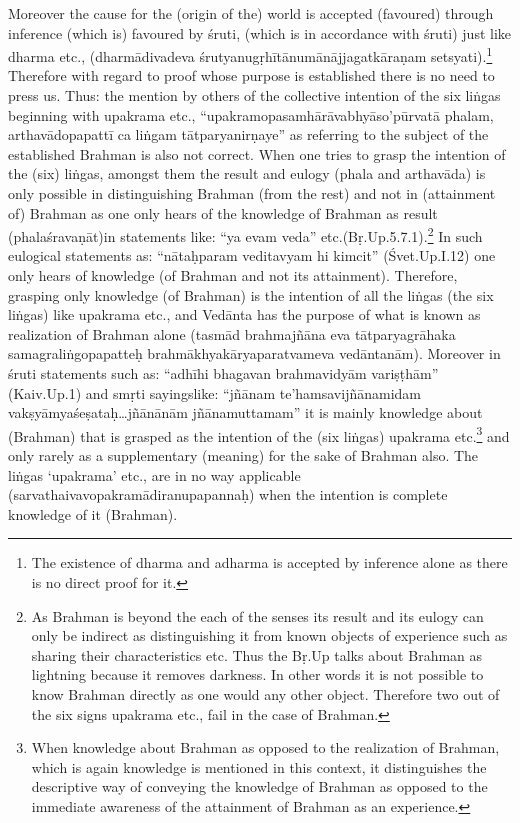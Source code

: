 

Moreover the cause for the (origin of the) world is accepted (favoured) through inference (which is) favoured by śruti, (which is in accordance with śruti) just like dharma etc., (dharmādivadeva śrutyanugṛhītānu\-mānājjagatkāraṇam setsyati).\footnote{The existence of dharma and adharma is accepted by inference alone as there is no direct proof for it.} Therefore with regard to proof whose purpose is established there is no need to press us. Thus: the mention by others of the collective intention of the six liṅgas beginning with upakrama etc., “upakramopasamhārāvabhyāso’pūrvatā phalam, arthavādopapattī ca liṅgam tātparyanirṇaye” as referring to the subject of the established Brahman is also not correct. When one tries to grasp the intention of the (six) liṅgas, amongst them the result and eulogy (phala and arthavāda) is only possible in distinguishing Brahman (from the rest) and not in (attainment of) Brahman as one only hears of the knowledge of Brahman as result (phalaśravaṇāt)in statements like: “ya evam veda” etc.(Bṛ.Up.5.7.1).\footnote{As Brahman is beyond the each of the senses its result and its eulogy can only be indirect as distinguishing it from known objects of experience such as sharing their characteristics etc. Thus the Bṛ.Up talks about Brahman as lightning because it removes darkness. In other words it is not possible to know Brahman directly as one would any other object. Therefore two out of the six signs upakrama etc., fail in the case of Brahman.} In such eulogical statements as: “nātaḥparam veditavyam hi kimcit” (Śvet.Up.I.12) one only hears of knowledge (of Brahman and not its attainment). Therefore, grasping only knowledge (of Brahman) is the intention of all the liṅgas (the six liṅgas) like upakrama etc., and Vedānta has the purpose of what is known as realization of Brahman alone (tasmād brahmajñāna eva tātparyagrāhaka samagraliṅgopapatteḥ brahmākhyakāryaparatvameva vedāntanām). Moreover in śruti statements such as: “adhīhi bhagavan brahmavidyām variṣṭhām” (Kaiv.Up.1) and smṛti sayings\break like: “jñānam te’hamsavijñānamidam vakṣyāmyaśeṣataḥ…jñānānām jñānamuttamam” it is mainly knowledge about (Brahman) that is gras\-ped as the intention of the (six liṅgas) upakrama etc.\footnote{When knowledge about Brahman as opposed to the realization of Brahman, which is again knowledge is mentioned in this context, it distinguishes the descriptive way of conveying the knowledge of Brahman as opposed to the immediate awareness of the attainment of Brahman as an experience.} and only rarely as a supplementary (meaning) for the sake of Brahman also. The liṅgas ‘upakrama’ etc., are in no way applicable  (sarvathaivavopakramādiranupapannaḥ) when the intention is  complete knowledge of it (Brahman).

